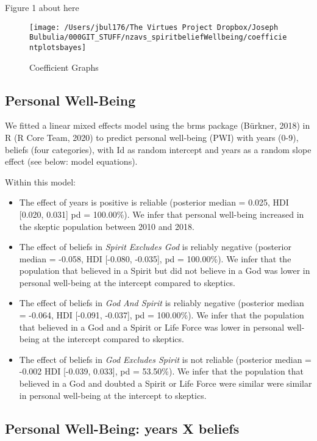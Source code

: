 \documentclass[
  english,
  man,floatsintext]{apa6}
\providecommand{\tightlist}{%
  \setlength{\itemsep}{0pt}\setlength{\parskip}{0pt}}
\begin{document}
Figure 1 about here

\begin{figure}
\texttt{[image: /Users/jbul176/The Virtues Project Dropbox/Joseph Bulbulia/000GIT\_STUFF/nzavs\_spiritbeliefWellbeing/coefficientplotsbayes]} \caption{Coefficient Graphs}\label{fig:unnamed-chunk-1}
\end{figure}

\hypertarget{personal-well-being-1}{%
\subsection{Personal Well-Being}\label{personal-well-being-1}}

We fitted a linear mixed effects model using the brms package (Bürkner, 2018) in R (R Core Team, 2020) to predict personal well-being (PWI) with years (0-9), beliefs (four categories), with Id as random intercept and years as a random slope effect (see below: model equations).

Within this model:

\begin{itemize}
\tightlist
\item
  The effect of years is positive is reliable (posterior median = 0.025, HDI {[}0.020, 0.031{]} pd = 100.00\%). We infer that personal well-being increased in the skeptic population between 2010 and 2018.
\item
  The effect of beliefs in \emph{Spirit Excludes God} is reliably negative (posterior median = -0.058, HDI {[}-0.080, -0.035{]}, pd = 100.00\%). We infer that the population that believed in a Spirit but did not believe in a God was lower in personal well-being at the intercept compared to skeptics.
\item
  The effect of beliefs in \emph{God And Spirit} is reliably negative (posterior median = -0.064, HDI {[}-0.091, -0.037{]}, pd = 100.00\%). We infer that the population that believed in a God and a Spirit or Life Force was lower in personal well-being at the intercept compared to skeptics.
\item
  The effect of beliefs in \emph{God Excludes Spirit} is not reliable (posterior median = -0.002 HDI {[}-0.039, 0.033{]}, pd = 53.50\%). We infer that the population that believed in a God and doubted a Spirit or Life Force were similar were similar in personal well-being at the intercept to skeptics.
\end{itemize}

\hypertarget{personal-well-being-years-x-beliefs}{%
\subsection{Personal Well-Being: years X beliefs}\label{personal-well-being-years-x-beliefs}}
\end{document}
